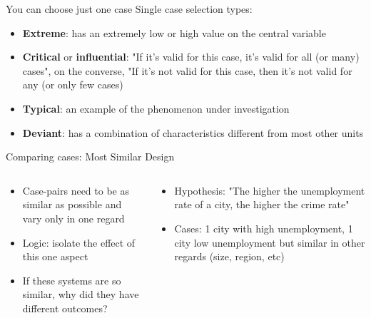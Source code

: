 \documentclass[10pt, aspectratio=169]{beamer}
\begin{document}
\begin{frame}{You can choose just one case}
Single case selection types: \vspace{0.3cm}
\begin{itemize}
    \item \textbf{Extreme}: has an extremely low or high value on the central variable\vspace{0.3cm}
    \item \textbf{Critical} or \textbf{influential}: "If it's valid for this case, it's valid for all (or many) cases", on the converse, "If it's not valid for this case, then it's not valid for any (or only few cases) \vspace{0.3cm}
    \item \textbf{Typical}: an example of the phenomenon under investigation\vspace{0.3cm}
    \item \textbf{Deviant}: has a combination of characteristics different from most other units \vspace{0.3cm}
\end{itemize}
\end{frame}


\begin{frame}{Comparing cases: Most Similar Design}
    \begin{columns}
        \begin{column}{0.5\textwidth}
            \begin{itemize}
                \item Case-pairs need to be as similar as possible and vary only in one regard \vspace{0.3cm}
                \item Logic: isolate the effect of this one aspect \vspace{0.3cm}
                \item If these systems are so similar, why did they have different outcomes?
            \end{itemize}
        \end{column}
        \vline
        \begin{column}{0.5\textwidth}
            \begin{itemize}
                \item Hypothesis: "The higher the unemployment rate of a city, the higher the crime rate"\vspace{0.3cm}
                \item Cases: 1 city with high unemployment, 1 city low unemployment but similar in other regards (size, region, etc)\vspace{0.3cm}
            \end{itemize}
        \end{column}
    \end{columns}
\end{frame}
\end{document}
